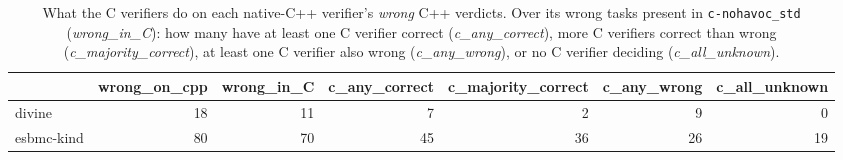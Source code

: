 \begin{table}[t]
  \centering
  \caption{What the C verifiers do on each native-C++ verifier's \emph{wrong} C++ verdicts. Over its wrong tasks present in \texttt{c-nohavoc_std} (\emph{wrong\_in\_C}): how many have at least one C verifier correct (\emph{c\_any\_correct}), more C verifiers correct than wrong (\emph{c\_majority\_correct}), at least one C verifier also wrong (\emph{c\_any\_wrong}), or no C verifier deciding (\emph{c\_all\_unknown}).}
  \label{tab:cpp-wrong-recovery}
\begin{tabular}{lrrrrrr}
\toprule
 & wrong\_on\_cpp & wrong\_in\_C & c\_any\_correct & c\_majority\_correct & c\_any\_wrong & c\_all\_unknown \\
\midrule
divine & 18 & 11 & 7 & 2 & 9 & 0 \\
esbmc-kind & 80 & 70 & 45 & 36 & 26 & 19 \\
\bottomrule
\end{tabular}
\end{table}
